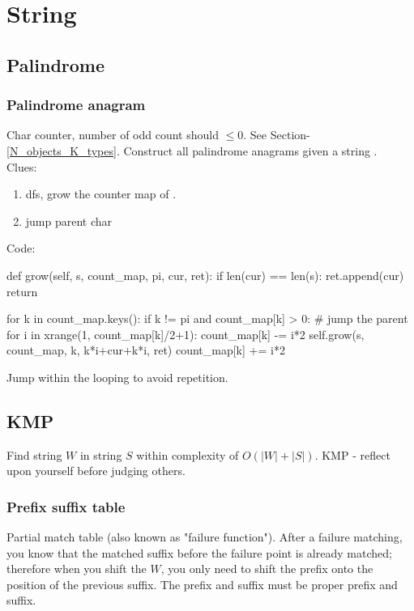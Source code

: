 \chapter{String}

\section{Palindrome}
\subsection{Palindrome anagram}
 Char counter, number of odd count should $\leq 0$.
 See Section-\ref{N_objects_K_types}.
 Construct all palindrome anagrams given a string .
\\
Clues:
\begin{enumerate}
\item dfs, grow the counter map of . 
\item jump parent char
\end{enumerate}
Code:
\begin{python}
def grow(self, s, count_map, pi, cur, ret):
  if len(cur) == len(s):
    ret.append(cur)
    return

  for k in count_map.keys():
    if k != pi and count_map[k] > 0:
      # jump the parent
      for i in xrange(1, count_map[k]/2+1):
        count_map[k] -= i*2
        self.grow(s, count_map, k, k*i+cur+k*i, ret)
        count_map[k] += i*2
\end{python}

Jump within the looping to avoid repetition. 

\section{KMP}
Find string $W$ in string $S$ within complexity of $O(|W|+|S|)$. KMP - reflect upon yourself before judging others.
\subsection{Prefix suffix table}
Partial match table (also known as "failure function"). After a failure matching, you know that the matched suffix before the failure point is already matched; therefore when you shift the $W$, you only need to shift the prefix onto the position of the previous suffix. The prefix and suffix must be proper prefix and suffix.

